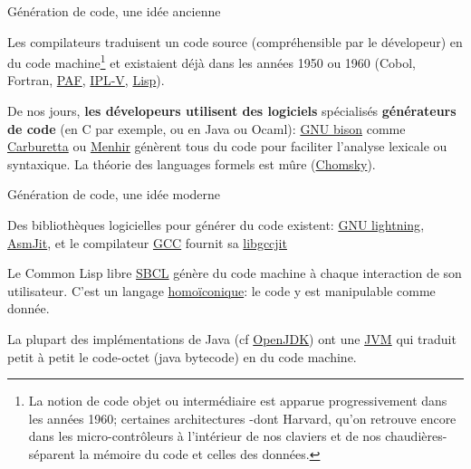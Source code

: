 \documentclass[final,a4,xcolor={svgnames,dvipsnames}]{beamer}
\begin{document}
 \begin{frame}{Génération de code, une idée ancienne}

  Les compilateurs traduisent un code source (compréhensible par le
  dévelopeur) en du code machine\footnote{La notion de code objet ou
  intermédiaire est apparue progressivement dans les années 1960;
  certaines architectures -dont Harvard, qu'on retrouve encore dans
  les micro-contrôleurs à l'intérieur de nos claviers et de nos
  chaudières- séparent la mémoire du code et celles des données.} et
  existaient déjà dans les années 1950 ou 1960 (Cobol, Fortran,
  \href{https://fr.wikipedia.org/wiki/Programmation_automatique_des_formules}{PAF},
  \href{https://en.wikipedia.org/wiki/Information_Processing_Language}{IPL-V},
  \href{https://fr.wikipedia.org/wiki/Lisp}{Lisp}).

  \bigskip

  De nos jours, \textbf{les dévelopeurs utilisent des logiciels}
  spécialisés \textbf{générateurs de code} (en C par exemple, ou en
  Java ou Ocaml): \href{https://www.gnu.org/software/bison/}{GNU
    bison} comme \href{https://carburetta.com/}{Carburetta} ou
  \href{https://gallium.inria.fr/~fpottier/menhir/}{Menhir} génèrent
  tous du code pour faciliter l'analyse lexicale ou syntaxique. La
  théorie des languages formels est mûre
  (\href{https://fr.wikipedia.org/wiki/Noam_Chomsky}{Chomsky}).
 \end{frame}

 \begin{frame}{Génération de code, une idée moderne}

  Des bibliothèques logicielles pour générer du code existent:
  \href{https://www.gnu.org/software/lightning/}{GNU lightning},
  \href{https://asmjit.com/}{AsmJit}, et le compilateur
  \href{https://gcc.gnu.org/}{GCC} fournit sa
  \href{https://gcc.gnu.org/onlinedocs/jit/}{libgccjit}

  \bigskip
  
  Le Common Lisp libre \href{https://sbcl.org/}{SBCL} génère du code
  machine à chaque interaction de son utilisateur. C'est un langage \href{https://fr.wikipedia.org/wiki/Homoiconicité}{homoïconique}: le code y est manipulable comme donnée.

  \bigskip
  
  La plupart des implémentations de Java (cf
  \href{https://openjdk.org/}{OpenJDK}) ont une
  \href{https://fr.wikipedia.org/wiki/Machine_virtuelle_Java}{JVM} qui
  traduit petit à petit le code-octet (java bytecode) en du code
  machine.

 \end{frame}
\end{document}
